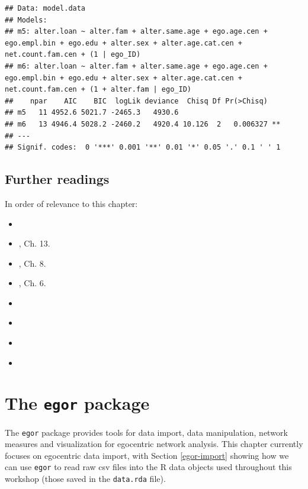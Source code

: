 \documentclass[
]{book}
\providecommand{\tightlist}{%
  \setlength{\itemsep}{0pt}\setlength{\parskip}{0pt}}
\begin{document}
\begin{verbatim}
## Data: model.data
## Models:
## m5: alter.loan ~ alter.fam + alter.same.age + ego.age.cen + ego.empl.bin + ego.edu + alter.sex + alter.age.cat.cen + net.count.fam.cen + (1 | ego_ID)
## m6: alter.loan ~ alter.fam + alter.same.age + ego.age.cen + ego.empl.bin + ego.edu + alter.sex + alter.age.cat.cen + net.count.fam.cen + (1 + alter.fam | ego_ID)
##    npar    AIC    BIC  logLik deviance  Chisq Df Pr(>Chisq)   
## m5   11 4952.6 5021.7 -2465.3   4930.6                        
## m6   13 4946.4 5028.2 -2460.2   4920.4 10.126  2   0.006327 **
## ---
## Signif. codes:  0 '***' 0.001 '**' 0.01 '*' 0.05 '.' 0.1 ' ' 1
\end{verbatim}

\hypertarget{further-readings}{%
\section{Further readings}\label{further-readings}}

In order of relevance to this chapter:

\begin{itemize}
\tightlist
\item
  \citet{vacca_multilevel_2018}
\item
  \citet{mccarty_conducting_2019}, Ch. 13.
\item
  \citet{perry_egocentric_2018}, Ch. 8.
\item
  \citet{crossley_social_2015}, Ch. 6.
\item
  \citet{vacca_cross-classified_2019}
\item
  \citet{simonoff_multilevel_2013}
\item
  \citet{rasbash_lemma:_2008}
\item
  \citet{snijders_multilevel_2012}
\end{itemize}

\hypertarget{egor}{%
\chapter{\texorpdfstring{The \texttt{egor} package}{The egor package}}\label{egor}}

The \texttt{egor} package provides tools for data import, data manipulation, network measures and visualization for egocentric network analysis. This chapter currently focuses on egocentric data import, with Section \ref{egor-import} showing how we can use \texttt{egor} to read raw csv files into the R data objects used throughout this workshop (those saved in the \texttt{data.rda} file).
\end{document}
